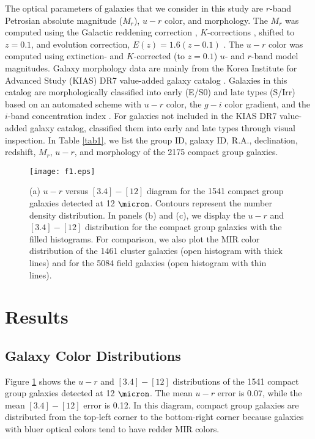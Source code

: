 \documentclass[12pt,preprint,apj]{emulateapj}
\begin{document}
The optical parameters of galaxies that we consider in this study are 
$r$-band Petrosian absolute magnitude ($M_r$), $u-r$ color, and morphology. 
The $M_r$ was computed using the Galactic reddening correction \citep{schlegel+98}, 
$K$-corrections \citep{blanton+07}, shifted to $z=0.1$, and 
evolution correction, $E(z)=1.6(z-0.1)$ \citep{tegmark+04}.
The $u-r$ color was computed using extinction- and $K$-corrected (to $z=0.1$)
$u$- and $r$-band model magnitudes.
Galaxy morphology data are mainly from the Korea Institute for Advanced Study
(KIAS) DR7 value-added galaxy catalog \citep{choi+10}. 
Galaxies in this catalog are morphologically classified into early (E/S0) and 
late types (S/Irr) based on an automated scheme with $u-r$ color, 
the $g-i$ color gradient, and the $i$-band concentration index \citep{park+05}. 
For galaxies not included in the KIAS DR7 value-added galaxy catalog, \citet{sohn+16} 
classified them into early and late types through visual inspection. 
In Table \ref{tab1}, we list the group ID, galaxy ID, R.A., declination, redshift, 
$M_r$, $u-r$, and morphology of the 2175 compact group galaxies.

\begin{figure}
\centering
\texttt{[image: f1.eps]}
\caption{(a) $u-r$ versus $[3.4]-[12]$ diagram for the 1541 compact group galaxies 
detected at 12 $\micron$. Contours represent the number density distribution.
In panels (b) and (c), we display the $u-r$ and $[3.4]-[12]$ distribution for 
the compact group galaxies with the filled histograms.  For comparison, we also plot 
the MIR color distribution of the 1461 cluster galaxies (open histogram with thick lines) 
and for the 5084 field galaxies (open histogram with thin lines).
}
\label{colorhist}
\end{figure}




\section{Results}\label{result} 

\subsection{Galaxy Color Distributions}

Figure \ref{colorhist} shows the $u-r$ and $[3.4]-[12]$ distributions 
of the 1541 compact group galaxies detected at 12 $\micron$. 
The mean $u-r$ error is 0.07, while the mean $[3.4]-[12]$ error is 0.12. 
In this diagram, compact group galaxies are distributed from the top-left corner
to the bottom-right corner because galaxies with bluer optical colors tend to have 
redder MIR colors.
\end{document}
